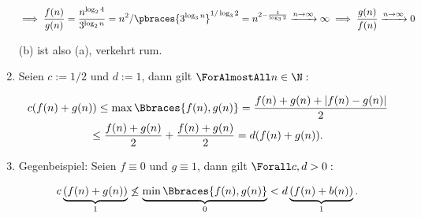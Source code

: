 \begin{solution}
\begin{enumerate}[label = (\alph*)]
  \begin{align*}
    \implies
    \frac{f(n)}{g(n)}
    =
    \frac{n^{\log_2{4}}}{3^{\log_2{n}}}
    =
    n^2 / \pbraces{3^{\log_3{n}}}^{1 / \log_3{2}}
    =
    n^{2 - \frac{1}{\log_3{2}}}
    \xrightarrow{n \to \infty} \infty
    \implies
    \frac{g(n)}{f(n)}
    \xrightarrow{n \to \infty} 0
  \end{align*}

  (b) ist also (a), verkehrt rum.

  \item

  \begin{comment}

    \begin{figure}[h!]
    \begin{boxedin}
      \vspace{0.5 cm}
      \hspace{0.5 cm}
      \texttt{[image: Kaltenbaeck - Fundament Analysis - Lemma 2-2-12-1.png]} \\
      \vspace{0.01 cm}
      \hspace{0.5 cm}
      \texttt{[image: Kaltenbaeck - Fundament Analysis - Lemma 2-2-12-2.png]} \\
      \vspace{0.5 cm}
      \caption{Kaltenbaeck - Fundament Analysis}
      \label{fig:KFAL2.2.12}
    \end{boxedin}
  \end{figure}

  \end{comment}

  Seien $c := 1/2$ und $d := 1$, dann gilt $\ForAlmostAll n \in \N:$

  \begin{multline*}
    c (f(n) + g(n))
    \leq
    \max \Bbraces{f(n), g(n)}
    =
    \frac{f(n) + g(n) + |f(n) - g(n)|}{2} \\
    \leq
    \frac{f(n) + g(n)}{2}
    +
    \frac{f(n) + g(n)}{2}
    =
    d (f(n) + g(n)).
  \end{multline*}

  \item Gegenbeispiel:
  Seien $f \equiv 0$ und $g \equiv 1$, dann gilt $\Forall c, d > 0:$

  \begin{align*}
    c \underbrace{(f(n) + g(n))}_1
    \not \leq
    \underbrace{\min \Bbraces{f(n), g(n)}}_0
    <
    d \underbrace{(f(n) + b(n))}_1.
  \end{align*}


\end{enumerate}
\end{solution}
